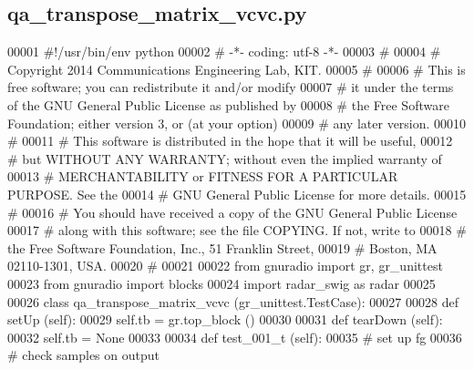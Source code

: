\subsection{qa\+\_\+transpose\+\_\+matrix\+\_\+vcvc.\+py}
\label{qa__transpose__matrix__vcvc_8py_source}

\begin{DoxyCode}
00001 \textcolor{comment}{#!/usr/bin/env python}
00002 \textcolor{comment}{# -*- coding: utf-8 -*-}
00003 \textcolor{comment}{# }
00004 \textcolor{comment}{# Copyright 2014 Communications Engineering Lab, KIT.}
00005 \textcolor{comment}{# }
00006 \textcolor{comment}{# This is free software; you can redistribute it and/or modify}
00007 \textcolor{comment}{# it under the terms of the GNU General Public License as published by}
00008 \textcolor{comment}{# the Free Software Foundation; either version 3, or (at your option)}
00009 \textcolor{comment}{# any later version.}
00010 \textcolor{comment}{# }
00011 \textcolor{comment}{# This software is distributed in the hope that it will be useful,}
00012 \textcolor{comment}{# but WITHOUT ANY WARRANTY; without even the implied warranty of}
00013 \textcolor{comment}{# MERCHANTABILITY or FITNESS FOR A PARTICULAR PURPOSE.  See the}
00014 \textcolor{comment}{# GNU General Public License for more details.}
00015 \textcolor{comment}{# }
00016 \textcolor{comment}{# You should have received a copy of the GNU General Public License}
00017 \textcolor{comment}{# along with this software; see the file COPYING.  If not, write to}
00018 \textcolor{comment}{# the Free Software Foundation, Inc., 51 Franklin Street,}
00019 \textcolor{comment}{# Boston, MA 02110-1301, USA.}
00020 \textcolor{comment}{# }
00021 
00022 \textcolor{keyword}{from} gnuradio \textcolor{keyword}{import} gr, gr\_unittest
00023 \textcolor{keyword}{from} gnuradio \textcolor{keyword}{import} blocks
00024 \textcolor{keyword}{import} radar\_swig \textcolor{keyword}{as} radar
00025 
00026 \textcolor{keyword}{class }qa_transpose_matrix_vcvc (gr\_unittest.TestCase):
00027 
00028     \textcolor{keyword}{def }setUp (self):
00029         self.tb = gr.top\_block ()
00030 
00031     \textcolor{keyword}{def }tearDown (self):
00032         self.tb = \textcolor{keywordtype}{None}
00033 
00034     \textcolor{keyword}{def }test_001_t (self):
00035         \textcolor{comment}{# set up fg}
00036         \textcolor{comment}{# check samples on output}

\end{DoxyCode}
